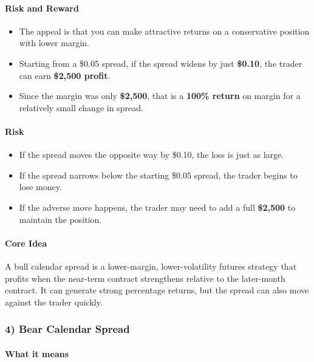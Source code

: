 \documentclass[12pt,openany]{book}
\begin{document}
\paragraph{Risk and Reward}

\begin{itemize}[leftmargin=*]
    \item The appeal is that you can make attractive returns on a conservative position with lower margin.
    \item Starting from a \$0.05 spread, if the spread widens by just \textbf{\$0.10}, the trader can earn \textbf{\$2,500 profit}.
    \item Since the margin was only \textbf{\$2,500}, that is a \textbf{100\% return} on margin for a relatively small change in spread.
\end{itemize}

\paragraph{Risk}

\begin{itemize}[leftmargin=*]
    \item If the spread moves the opposite way by \$0.10, the loss is just as large.
    \item If the spread narrows below the starting \$0.05 spread, the trader begins to lose money.
    \item If the adverse move happens, the trader may need to add a full \textbf{\$2,500} to maintain the position.
\end{itemize}

\paragraph{Core Idea}

A bull calendar spread is a lower-margin, lower-volatility futures strategy that profits when the near-term contract strengthens relative to the later-month contract. It can generate strong percentage returns, but the spread can also move against the trader quickly.

\subsubsection{4) Bear Calendar Spread}

\paragraph{What it means}
\end{document}
